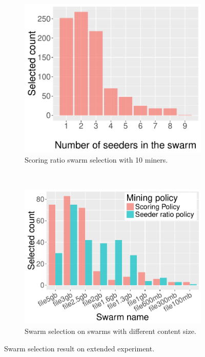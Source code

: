 \begin{figure}[th!]
	\begin{adjustwidth}{-1.5cm}{}
		\begin{subfigure}[t]{0.6\textwidth}
			\centering
			\includegraphics[width=\textwidth]{pics/results/sc10_bar.pdf}
			\caption{Scoring ratio swarm selection with 10 miners.}
			\label{fig:scattersc10}
		\end{subfigure}
		~
		\begin{subfigure}[t]{0.6\textwidth}
			\centering
			\includegraphics[width=\textwidth]{pics/results/scmulti_bar.pdf}
			\caption{Swarm selection on swarms with different content size.}
			\label{fig:scatterscmulti}
		\end{subfigure}
		\caption{Swarm selection result on extended experiment.}
	\end{adjustwidth}
\end{figure}

